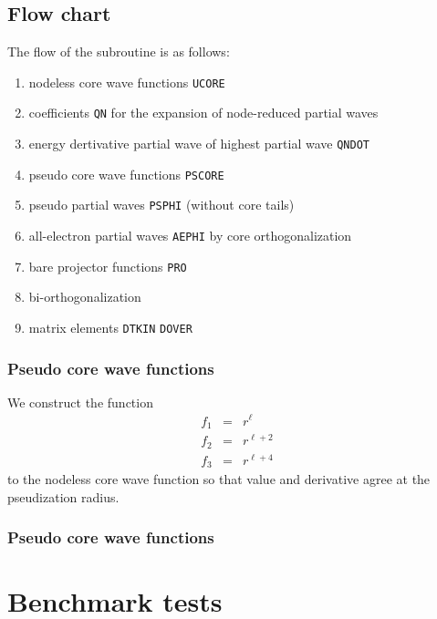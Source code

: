 \documentclass[11pt,a4paper]{report}
\begin{document}
\subsection{Flow chart}
The flow of the subroutine is as follows:
\begin{enumerate}
\item nodeless core wave functions \verb|UCORE|
\item coefficients \verb|QN| for the expansion of node-reduced partial waves 
\item energy dertivative partial wave of highest partial wave \verb|QNDOT|
\item pseudo core wave functions \verb|PSCORE|
\item pseudo partial waves \verb|PSPHI| (without core tails)
\item all-electron partial waves \verb|AEPHI| by core orthogonalization
\item bare projector functions \verb|PRO|
\item bi-orthogonalization
\item matrix elements \verb|DTKIN| \verb|DOVER|
\end{enumerate}

\subsubsection{Pseudo core wave functions}
We construct the function
\begin{eqnarray}
f_1&=&r^\ell
\nonumber\\
f_2&=& r^{\ell+2}
\nonumber\\
f_3&=& r^{\ell+4}
\end{eqnarray}
to the nodeless core wave function so that value and derivative agree
at the pseudization radius.


\subsubsection{Pseudo core wave functions}
\section{Benchmark tests}
\end{document}
